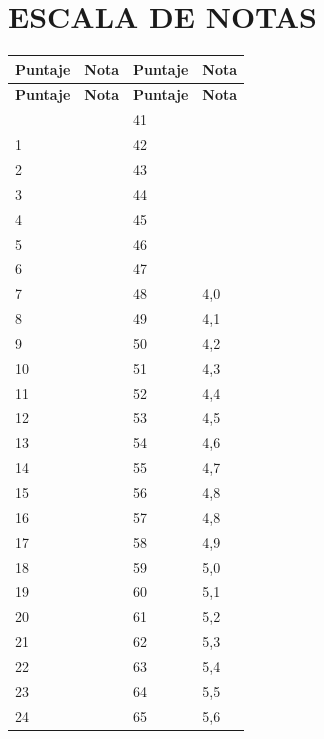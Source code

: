 \documentclass[12pt]{article}
\begin{document}
\section*{ESCALA DE NOTAS}
\begin{longtable}{|p{2cm}|p{2cm}|p{2cm}|p{2cm}|}
\hline
\textbf{Puntaje}&\textbf{Nota}&\textbf{Puntaje}&\textbf{Nota}\\\hline
\endfirsthead
\hline
\textbf{Puntaje}&\textbf{Nota}&\textbf{Puntaje}&\textbf{Nota}\\\hline
\endhead
\hline
\endfoot
0	&\color{red}{1,0}	&41	&\color{red}{3,6}\\ \hline
1	&\color{red}{1,1}	&42	&\color{red}{3,6}\\ \hline
2	&\color{red}{1,1}	&43	&\color{red}{3,7}\\ \hline
3	&\color{red}{1,2}	&44	&\color{red}{3,8}\\ \hline
4	&\color{red}{1,3}	&45	&\color{red}{3,8}\\ \hline
5	&\color{red}{1,3}	&46	&\color{red}{3,9}\\ \hline
6	&\color{red}{1,4}	&47	&\color{red}{3,9}\\ \hline
7	&\color{red}{1,4}	&48	&4,0\\ \hline
8	&\color{red}{1,5}	&49	&4,1\\ \hline
9	&\color{red}{1,6}	&50	&4,2\\ \hline
10	&\color{red}{1,6}	&51	&4,3\\ \hline
11	&\color{red}{1,7}	&52	&4,4\\ \hline
12	&\color{red}{1,8}	&53	&4,5\\ \hline
13	&\color{red}{1,8}	&54	&4,6\\ \hline
14	&\color{red}{1,9}	&55	&4,7\\ \hline
15	&\color{red}{1,9}	&56	&4,8\\ \hline
16	&\color{red}{2,0}	&57	&4,8\\ \hline
17	&\color{red}{2,1}	&58	&4,9\\ \hline
18	&\color{red}{2,1}	&59	&5,0\\ \hline
19	&\color{red}{2,2}	&60	&5,1\\ \hline
20	&\color{red}{2,3}	&61	&5,2\\ \hline
21	&\color{red}{2,3}	&62	&5,3\\ \hline
22	&\color{red}{2,4}	&63	&5,4\\ \hline
23	&\color{red}{2,4}	&64	&5,5\\ \hline
24	&\color{red}{2,5}	&65	&5,6\\ \hline

\end{longtable}
\end{document}
